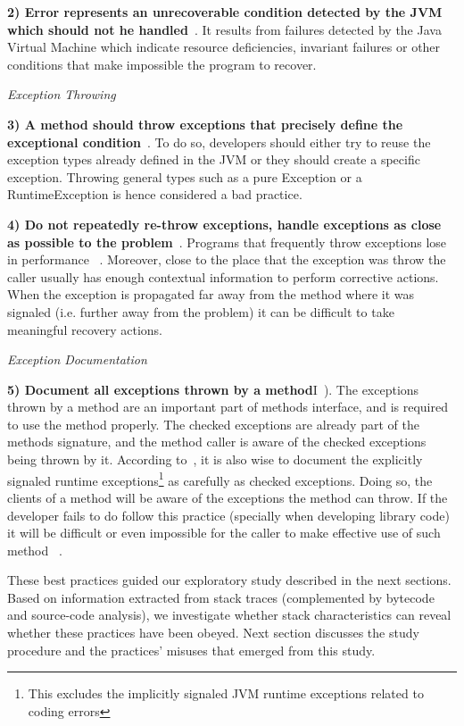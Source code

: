 \documentclass[conference]{IEEEtran}
\begin{document}
\textbf{2) Error represents an unrecoverable condition detected by the JVM which should not he handled}~\cite{gosling2000java}. It results from failures detected by the Java Virtual Machine which indicate resource deficiencies, invariant failures or other conditions that make impossible the program to recover.

\noindent\emph{Exception Throwing}

\textbf{3) A method should throw exceptions that precisely define the exceptional condition}~\cite{gosling2000java,bloch2008effective}. To do so, developers should either try to reuse the exception types already defined in the JVM or they should create a specific exception. Throwing general types such as a pure Exception or a RuntimeException is hence considered a bad practice.

\textbf{4) Do not repeatedly re-throw exceptions, handle exceptions as close as possible to the problem}~\cite{wirfs2006toward}. Programs that frequently throw exceptions lose in performance ~\cite{wirfs2006toward,gosling2000java}. Moreover, close to the place that the exception was throw the caller usually has enough contextual information to perform  corrective actions. When the exception is propagated far away from the method where it was signaled (i.e. further away from the problem) it can be difficult to take meaningful recovery actions.

\noindent\emph{Exception Documentation}

\textbf{5) Document all exceptions thrown by a method}I~\cite{mandrioli1992advances,gosling2000java,wirfs2006toward,bloch2008effective}). The exceptions thrown by a method are an important part of methods interface, and is required to use the method properly. The checked exceptions are already part of the  methods signature, and the method caller is aware of the checked exceptions being thrown by it. According to~\cite{bloch2008effective}, it is also wise to document the explicitly signaled runtime exceptions\footnote{This excludes the implicitly signaled JVM runtime exceptions related to coding errors} as carefully as checked exceptions. Doing so, the clients of a method will be aware of the exceptions the method can throw. If the developer fails to do follow this practice (specially when developing library code) it will be difficult or even impossible for the caller to make effective use of such method ~\cite{wirfs2006toward, bloch2008effective}.

These best practices guided our exploratory study described in the next sections. Based on information extracted from stack traces (complemented by bytecode and source-code analysis), we investigate whether stack characteristics can reveal whether these practices have been obeyed. Next section discusses the study procedure and the practices' misuses that emerged from this study.
\end{document}
